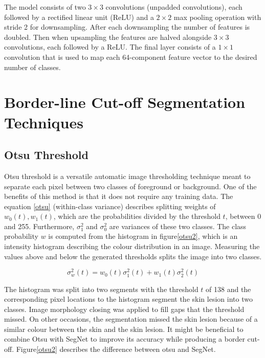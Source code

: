 The model consists of two $3\times3$ convolutions (unpadded convolutions), each followed by a rectified linear unit (ReLU) and a $2\times2$ max pooling operation with stride 2 for downsampling. After each downsampling the number of features is doubled. Then when upsampling the features are halved alongside $3\times3$ convolutions, each followed by a ReLU. The final layer consists of a $1\times1$ convolution that is used to map each 64-component feature vector to the desired number of classes. 


\section{Border-line Cut-off Segmentation Techniques}

\subsection{Otsu Threshold}
Otsu threshold is a versatile automatic image thresholding technique meant to separate each pixel between two classes of foreground or background. One of the benefits of this method is that it does not require any training data. The equation \ref{otsu} (within-class variance) describes splitting weights of $w_0(t),w_1(t)$, which are the probabilities divided by the threshold $t$, between 0 and 255. Furthermore, $\sigma_1^2$ and $\sigma_0^2$ are variances of these two classes. The class probability $w$ is computed from the histogram in figure\ref{otsu2}, which is an intensity histogram describing the colour distribution in an image. Measuring the values above and below the generated thresholds splits the image into two classes.

\begin{equation}
\sigma_w^2(t) = w_0(t)\sigma_1^2(t) + w_1(t)\sigma_2^2(t)
\end{equation}\label{otsu}

The histogram was split into two segments with the threshold $t$ of 138 and the corresponding pixel locations to the histogram segment the skin lesion into two classes. Image morphology closing was applied to fill gaps that the threshold missed. On other occasions, the segmentation missed the skin lesion because of a similar colour between the skin and the skin lesion. It might be beneficial to combine Otsu with SegNet to improve its accuracy while producing a border cut-off. Figure\ref{otsu2} describes the difference between otsu and SegNet.

